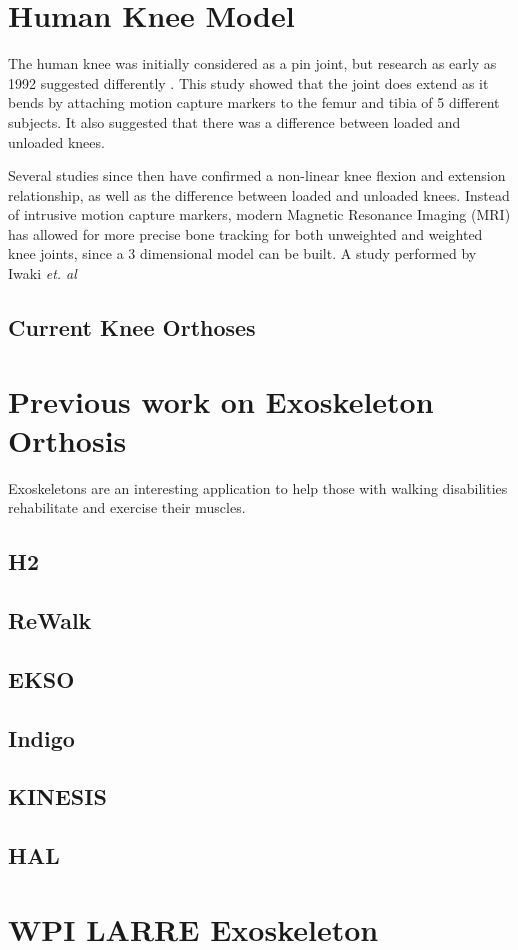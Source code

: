 \section{Human Knee Model}
\label{sec:KneeModel}

The human knee was initially considered as a pin joint, but research as early as 1992 suggested differently \cite{3DKinKneeJointOldStabby}. This study showed that the joint does extend as it bends by attaching motion capture markers to the femur and tibia of 5 different subjects. It also suggested that there was a difference between loaded and unloaded knees.

Several studies since then have confirmed a non-linear knee flexion and extension relationship, as well as the difference between loaded and unloaded knees. Instead of intrusive motion capture markers, modern Magnetic Resonance Imaging (MRI) has allowed for more precise bone tracking for both unweighted and weighted knee joints, since a 3 dimensional model can be built. A study performed by Iwaki \textit{et. al} 



\subsection{Current Knee Orthoses}

\section{Previous work on Exoskeleton Orthosis}
\label{sec:OtherExos}
Exoskeletons are an interesting application to help those with walking disabilities rehabilitate and exercise their muscles.

\subsection{H2}

\subsection{ReWalk}

\subsection{EKSO}

\subsection{Indigo}

\subsection{KINESIS}

\subsection{HAL}

\section{WPI LARRE Exoskeleton}
